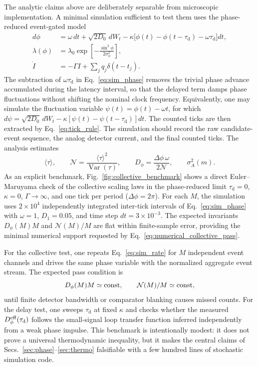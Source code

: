 \documentclass[aps,pre,reprint,amsmath,amssymb,floatfix,nofootinbib]{revtex4-2}
\newcommand{\avg}[1]{\langle #1 \rangle}
\newcommand{\Dphi}{D_{\phi}}
\newcommand{\taud}{\tau_{\mathrm{d}}}
\begin{document}
The analytic claims above are deliberately separable from microscopic
implementation. A minimal simulation sufficient to test them uses the
phase-reduced event-gated model
\begin{align}
  d\phi &= \omega\,dt + \sqrt{2D_0}\,dW_t
  -\kappa\big[\phi(t)-\phi(t-\taud)-\omega\taud\big]dt,
  \label{eq:sim_phase}\\
  \lambda(\phi) &= \lambda_0
  \exp\!\left[-\frac{\sin^2\phi}{2\sigma_\phi^2}\right],
  \label{eq:sim_rate}\\
  \dot I &= -\Gamma I+\sum_j q_j\delta(t-t_j).
  \label{eq:sim_detector}
\end{align}
The subtraction of $\omega\taud$ in Eq.~\eqref{eq:sim_phase} removes the
trivial phase advance accumulated during the latency interval, so that the
delayed term damps phase fluctuations without shifting the nominal clock
frequency. Equivalently, one may simulate the fluctuation variable
$\psi(t)=\phi(t)-\omega t$, for which
$ d\psi=\sqrt{2D_0}\,dW_t-\kappa[\psi(t)-\psi(t-\taud)]dt$.
The counted ticks are then extracted by Eq.~\eqref{eq:tick_rule}. The
simulation should record the raw candidate-event sequence, the analog
detector current, and the final counted ticks. The analysis estimates
\begin{equation}
  \avg{\tau},
  \qquad
  \mathcal{N}=\frac{\avg{\tau}^2}{\operatorname{Var}(\tau)},
  \qquad
  D_\phi=\frac{\Delta\phi\,\omega}{2\mathcal{N}},
  \qquad
  \sigma_A^2(m).
  \label{eq:numerical_observables}
\end{equation}
As an explicit benchmark, Fig.~\ref{fig:collective_benchmark} shows a
direct Euler--Maruyama check of the collective scaling laws in the
phase-reduced limit $\taud=0$, $\kappa=0$, $\Gamma\to\infty$, and one
tick per period ($\Delta\phi=2\pi$). For each $M$, the simulation uses
$2\times10^4$ independently integrated inter-tick intervals of
Eq.~\eqref{eq:sim_phase} with $\omega=1$, $D_1=0.05$, and time step
$dt=3\times10^{-3}$. The expected invariants $\Dphi(M)M$ and
$\mathcal{N}(M)/M$ are flat within finite-sample error, providing the
minimal numerical support requested by Eq.~\eqref{eq:numerical_collective_pass}.

For the collective test, one repeats Eq.~\eqref{eq:sim_rate} for
$M$ independent event channels and drives the same phase variable with
the normalized aggregate event stream. The expected pass condition is
\begin{equation}
  D_\phi(M)M \simeq {\rm const},
  \qquad
  \mathcal{N}(M)/M \simeq {\rm const},
  \label{eq:numerical_collective_pass}
\end{equation}
until finite detector bandwidth or comparator blanking causes missed
counts. For the delay test, one sweeps $\taud$ at fixed $\kappa$ and
checks whether the measured $D_\phi^{\rm eff}(\taud)$ follows the
small-signal loop transfer function inferred independently from a weak
phase impulse. This benchmark is intentionally modest: it does not prove
a universal thermodynamic inequality, but it makes the central claims of
Secs.~\ref{sec:phase}--\ref{sec:thermo} falsifiable with a few hundred
lines of stochastic simulation code.
\end{document}
